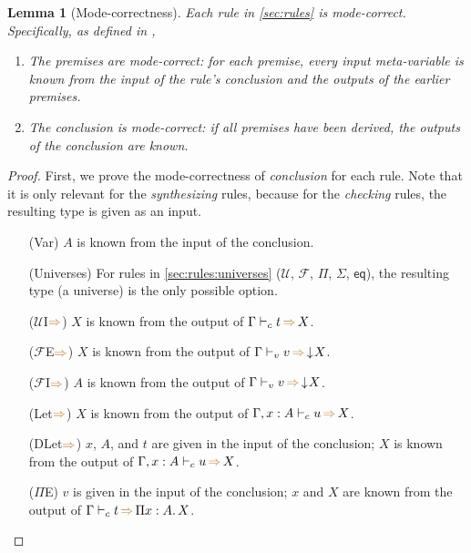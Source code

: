 \documentclass[a4,natbib=false]{article}
\newtheorem{lemma}{Lemma}
\newcommand{\ctov}{\mathcal{U}}
\newcommand{\vtoc}{\mathcal{F}}
\newcommand{\comptoval}[1]{\downarrow \hspace{-2pt} #1}
\newcommand{\pitype}[2]{\Pi {#1}.\,#2}
\newcommand{\infers}{{\color{brown} \Rightarrow}}
\newcommand{\judgecInfer}[3]{{#1} \vdash_{c} {#2} \, \infers \, {#3}}
\newcommand{\judgevInfer}[3]{{#1} \vdash_{v} {#2} \, \infers \, {#3}}
\begin{document}
\begin{lemma}[Mode-correctness]
  Each rule in \cref{sec:rules} is mode-correct. Specifically, as defined in \cite{dunfield2021:bidirectional},
  \begin{enumerate}
    \item The premises are mode-correct: for each premise, every input meta-variable is known from the input of the rule's conclusion and the outputs of the earlier premises.
    \item The conclusion is mode-correct: if all premises have been derived, the outputs of the conclusion are known.
  \end{enumerate}
\end{lemma}
\begin{proof}
  First, we prove the mode-correctness of \emph{conclusion} for each rule.
  Note that it is only relevant for the \emph{synthesizing} rules, because for the \emph{checking} rules, the resulting type is given as an input.

  \begin{multicols}{2}
  \begin{itemize}
  \item[(Var)]
    $A$ is known from the input of the conclusion.
  \item[(Universes)]
    For rules in \cref{sec:rules:universes} ($\ctov$, $\vtoc$, $\Pi$,
    $\Sigma$, $\mathsf{eq}$), the resulting type (a universe) is the only
    possible option.

  \item[($\ctov$I$\infers$)]
    $X$ is known from the output of $\judgecInfer{\Gamma}{t}{X}$.

  \item[($\vtoc$E$\infers$)]
    $X$ is known from the output of $\judgevInfer{\Gamma}{v}{\comptoval{X}}$.

  \item[($\vtoc$I$\infers$)]
    $A$ is known from the output of $\judgevInfer{\Gamma}{v}{\comptoval{X}}$.

  \item[(Let$\infers$)]
    $X$ is known from the output of $\judgecInfer{\Gamma, x : A}{u}{X}$.

  \item[(DLet$\infers$)]
    $x$, $A$, and $t$ are given in the input of the conclusion; $X$ is known
    from the output of $\judgecInfer{\Gamma, x:A}{u}{X}$.

  \item[($\Pi$E)]
    $v$ is given in the input of the conclusion; $x$ and $X$ are known from the
    output of $\judgecInfer{\Gamma}{t}{\pitype{x:A}{X}}$.


\end{itemize}
\end{multicols}
\end{proof}
\end{document}
